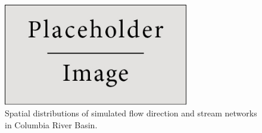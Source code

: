 \documentclass[final]{beamer}
\newlength{\threecolwid}
\begin{document}
\begin{frame}[t]
\begin{columns}[t]
    \begin{column}{\threecolwid}
      \vspace{3in}
      \begin{figure}
        \includegraphics[width = 0.72\textwidth]{figure/placeholder.jpg}
        \caption{Spatial distributions of simulated flow direction and stream networks in Columbia River Basin.}
        \label{fig:cbc}
      \end{figure}

    \end{column} %
    


\end{columns}
\end{frame}
\end{document}
